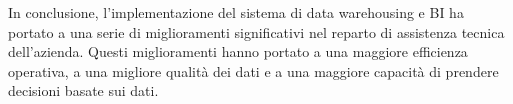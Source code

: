 In conclusione, l'implementazione del sistema di data warehousing e BI ha portato a una serie di miglioramenti significativi nel reparto di assistenza tecnica dell'azienda. Questi miglioramenti hanno portato a una maggiore efficienza operativa, a una migliore qualità dei dati e a una maggiore capacità di prendere decisioni basate sui dati.

\begin{comment}
\subsection{Conclusioni finali}

In conclusione, grazie ad un sistema progettato ad hoc sulle esigenze precedentemente definite, l'analisi ha coinvolto la raccolta, la pulizia e la trasformazione dei dati esistenti, consentendo di identificare le tendenze, modelli e criticità nel funzionamento del reparto di assistenza tecnica. L'utilizzo di strumenti di business intelligence che mettessero a disposizione statistiche e visualizzazioni delle informazioni così ricavate, ha facilitato la comprensione delle dinamiche sottostanti e ha fornito una base solida per la gestione del relativo processo aziendale. La combinazione di queste tecnologie fornisce una base solida per la presa di decisioni informate, consentendo all'azienda di rimanere competitiva e orientata al futuro.

In altre parole, questo progetto ha dimostrato l'importanza che un sistema di gestione ed analisi dati può avere nel miglioramento delle logiche aziendali. Attraverso uno studio approfondito e una progettazione minuziosa di un sistema basato sulle necessità dell'azienda, è possibile proporre soluzioni concrete che permettono di aumentare l'efficienza, l'efficacia, la qualità e la sicurezza delle prese di decisioni da parte dei manager aziendali. L'implementazione del sistema ha portato a miglioramenti nelle logiche aziendali. La capacità di monitorar in tempo reale le richieste dei clienti, anticipare le esigenze e ottimizzare le risorse ha contribuito ad una maggiore efficienza operativa del reparto in questione. La BI ha fornito strumenti per l'identificazione proattiva dei problemi e la pianificazione strategica delle risorse. Questo perché la la messa a disposizione delle informazioni chiare e dettagliate ha permesso ai manager aziendali di prendere decisioni informate e guidate dai dati strutturati.

Tuttavia, è importante sottolineare che la progettazione e l'implementazione di un sistema così definito è un processo complesso che richiede una pianificazione accurata e una relativa efficace gestione. Se tale requisiti non venissero soddisfati, il risultato del progetto stesso potrebbe riportare risultati negativi da ogni punto di vista, comportando a questo punto il rischio di compromettere il processo decisionale che si vorrebbe migliorare. Inoltre, il successo di un tale sistema, come spesso accennato durante lo studio, dipende in gran parte dalla qualità dei dati recuperati e messi poi a disposizione e dalle capacità dell'azienda di sfruttare efficacemente le informazioni derivate dall'analisi degli stessi.


\end{comment}
